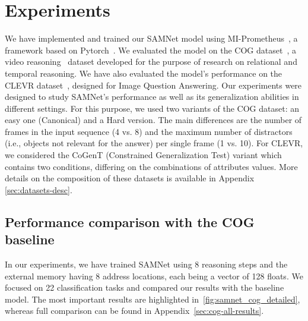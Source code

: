 \section{Experiments}

We have implemented and trained our SAMNet model using MI-Prometheus~\cite{kornuta2018accelerating}, a framework based on Pytorch~\cite{paszke2017automatic}. 
We evaluated the model on the COG dataset~\cite{yang2018dataset}, a video reasoning~\cite{mogadala2019trends} dataset developed for the purpose of research on relational and temporal reasoning. We have also evaluated the model's performance on the CLEVR dataset~\cite{johnson2017clevr}, designed for Image Question Answering.
Our experiments were designed to study SAMNet's performance as well as its generalization abilities in different settings.
For this purpose, we used two variants of the COG dataset: an easy one (Canonical) and a Hard version. The main differences are the number of frames in the input sequence (4 vs. 8) and the maximum number of distractors (i.e., objects not relevant for the answer) per single frame (1 vs. 10).
For CLEVR, we considered the CoGenT (Constrained Generalization Test) variant which contains two conditions, differing on the combinations of attributes values. More details on the composition of these datasets is available in Appendix \ref{sec:datasets-desc}.

\subsection{Performance comparison with the COG baseline}

In our experiments, we have trained SAMNet using 8 reasoning steps and the external memory having 8 address locations, each being a vector of 128 floats.
We focused on 22 classification tasks and compared our results with the baseline model.
The most important results are highlighted in~\cref{fig:samnet_cog_detailed}, whereas full comparison can be found in Appendix~\ref{sec:cog-all-results}.

